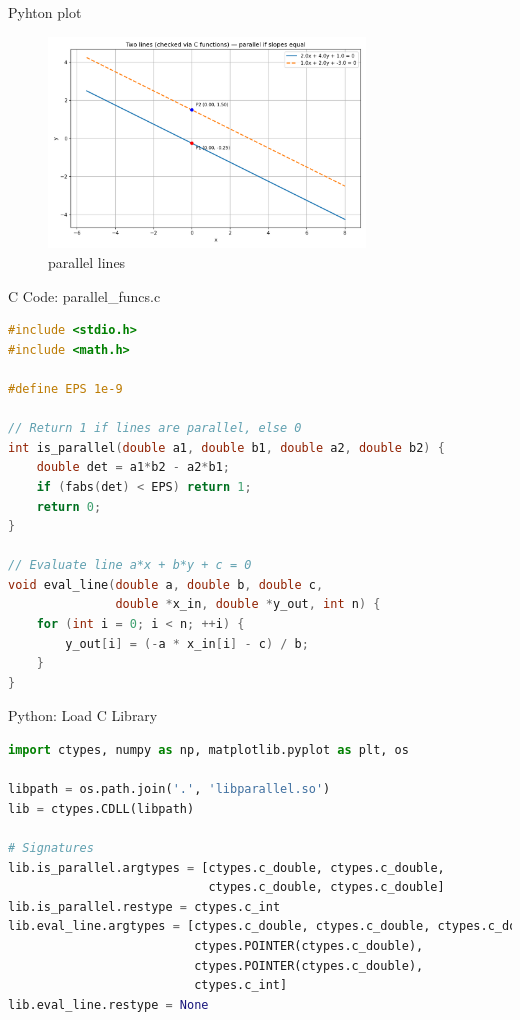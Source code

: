 \documentclass{beamer}
\begin{document}
\begin{frame}{Pyhton plot}
\begin{figure}[h!]
    \centering
    \includegraphics[width=0.75\textwidth]{figs/5.png}
    \caption{parallel lines}
    \label{fig:example_image}
    
\end{figure}
\end{frame}
\begin{frame}[fragile]{C Code: parallel\_funcs.c}
\begin{lstlisting}[language=C, basicstyle=\ttfamily\scriptsize, keywordstyle=\color{blue}]
#include <stdio.h>
#include <math.h>

#define EPS 1e-9

// Return 1 if lines are parallel, else 0
int is_parallel(double a1, double b1, double a2, double b2) {
    double det = a1*b2 - a2*b1;
    if (fabs(det) < EPS) return 1;
    return 0;
}

// Evaluate line a*x + b*y + c = 0
void eval_line(double a, double b, double c,
               double *x_in, double *y_out, int n) {
    for (int i = 0; i < n; ++i) {
        y_out[i] = (-a * x_in[i] - c) / b;
    }
}
\end{lstlisting}
\end{frame}

\begin{frame}[fragile]{Python: Load C Library}
\begin{lstlisting}[language=Python, basicstyle=\ttfamily\scriptsize, keywordstyle=\color{blue}]
import ctypes, numpy as np, matplotlib.pyplot as plt, os

libpath = os.path.join('.', 'libparallel.so')
lib = ctypes.CDLL(libpath)

# Signatures
lib.is_parallel.argtypes = [ctypes.c_double, ctypes.c_double,
                            ctypes.c_double, ctypes.c_double]
lib.is_parallel.restype = ctypes.c_int
lib.eval_line.argtypes = [ctypes.c_double, ctypes.c_double, ctypes.c_double,
                          ctypes.POINTER(ctypes.c_double),
                          ctypes.POINTER(ctypes.c_double),
                          ctypes.c_int]
lib.eval_line.restype = None
\end{lstlisting}
\end{frame}
\end{document}
